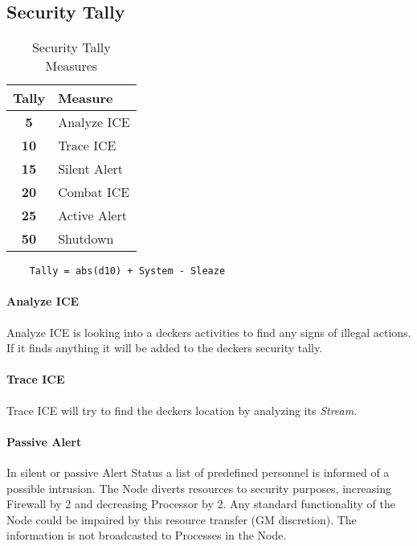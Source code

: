 \subsection{Security Tally}

\begin{table}[htb]
    \caption[Security Tally Measures]{Security Tally Measures}
    \label{tab:tally measures}
    \centering
    \begin{tabular}{cl}
        \toprule
        \textbf{Tally} & \textbf{Measure} \\
        \midrule
        \textbf{5}     & Analyze ICE      \\
        \textbf{10}    & Trace ICE        \\
        \textbf{15}    & Silent Alert     \\
        \textbf{20}    & Combat ICE       \\
        \textbf{25}    & Active Alert     \\
        \textbf{50}    & Shutdown         \\
        \bottomrule
    \end{tabular}
\end{table}



\begin{verbatim}
    Tally = abs(d10) + System - Sleaze
\end{verbatim}

\paragraph{Analyze ICE}

Analyze ICE is looking into a deckers activities to find any signs of illegal
actions. If it finds anything it will be added to the deckers security tally.

\paragraph{Trace ICE}

Trace ICE will try to find the deckers location by analyzing its \emph{Stream}.

\paragraph{Passive Alert}
In silent or passive Alert Status a list of predefined personnel is informed
of a possible intrusion. The Node diverts resources to security purposes,
increasing Firewall by 2 and decreasing Processor by 2. Any standard functionality
of the Node could be impaired by this resource transfer (GM discretion).
The information is not broadcasted to Processes in the Node.

